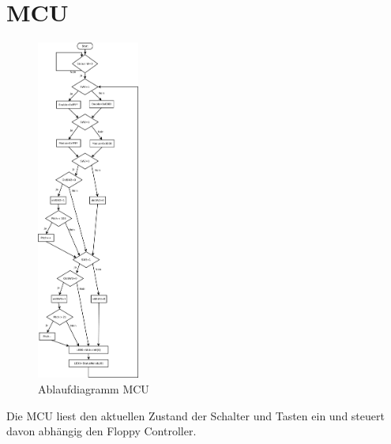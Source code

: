 \section{MCU}
\begin{figure}[h!]
    \centering
    \includegraphics[width=0.3\textwidth]{../organization/Ablaufdiagramm.pdf}
    \caption{Ablaufdiagramm MCU}
    \label{fig:block}
\end{figure}
\noindent Die MCU liest den aktuellen Zustand der Schalter und Tasten ein und steuert 
davon abhängig den Floppy Controller. 
